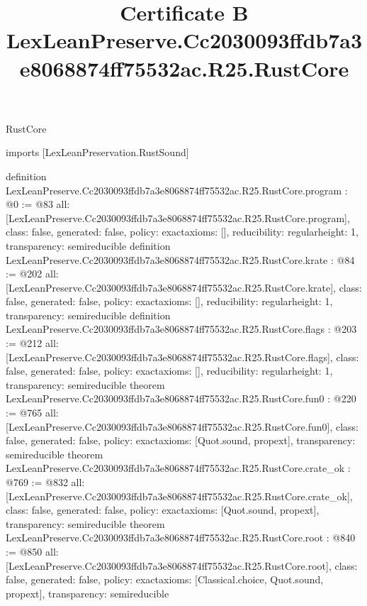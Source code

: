 \begin{lexlean}{RustCore}
\title{Certificate B LexLeanPreserve.Cc2030093ffdb7a3e8068874ff75532ac.R25.RustCore}
\begin{coremodule}
imports [LexLeanPreservation.RustSound]

definition LexLeanPreserve.Cc2030093ffdb7a3e8068874ff75532ac.R25.RustCore.program : @0 := @83 {
  all: [LexLeanPreserve.Cc2030093ffdb7a3e8068874ff75532ac.R25.RustCore.program],
  class: false,
  generated: false,
  policy: exact{axioms: []},
  reducibility: regular{height: 1},
  transparency: semireducible
}
definition LexLeanPreserve.Cc2030093ffdb7a3e8068874ff75532ac.R25.RustCore.krate : @84 := @202 {
  all: [LexLeanPreserve.Cc2030093ffdb7a3e8068874ff75532ac.R25.RustCore.krate],
  class: false,
  generated: false,
  policy: exact{axioms: []},
  reducibility: regular{height: 1},
  transparency: semireducible
}
definition LexLeanPreserve.Cc2030093ffdb7a3e8068874ff75532ac.R25.RustCore.flags : @203 := @212 {
  all: [LexLeanPreserve.Cc2030093ffdb7a3e8068874ff75532ac.R25.RustCore.flags],
  class: false,
  generated: false,
  policy: exact{axioms: []},
  reducibility: regular{height: 1},
  transparency: semireducible
}
theorem LexLeanPreserve.Cc2030093ffdb7a3e8068874ff75532ac.R25.RustCore.fun0 : @220 := @765 {
  all: [LexLeanPreserve.Cc2030093ffdb7a3e8068874ff75532ac.R25.RustCore.fun0],
  class: false,
  generated: false,
  policy: exact{axioms: [Quot.sound, propext]},
  transparency: semireducible
}
theorem LexLeanPreserve.Cc2030093ffdb7a3e8068874ff75532ac.R25.RustCore.crate_ok : @769 := @832 {
  all: [LexLeanPreserve.Cc2030093ffdb7a3e8068874ff75532ac.R25.RustCore.crate_ok],
  class: false,
  generated: false,
  policy: exact{axioms: [Quot.sound, propext]},
  transparency: semireducible
}
theorem LexLeanPreserve.Cc2030093ffdb7a3e8068874ff75532ac.R25.RustCore.root : @840 := @850 {
  all: [LexLeanPreserve.Cc2030093ffdb7a3e8068874ff75532ac.R25.RustCore.root],
  class: false,
  generated: false,
  policy: exact{axioms: [Classical.choice, Quot.sound, propext]},
  transparency: semireducible
}


\end{coremodule}
\end{lexlean}
